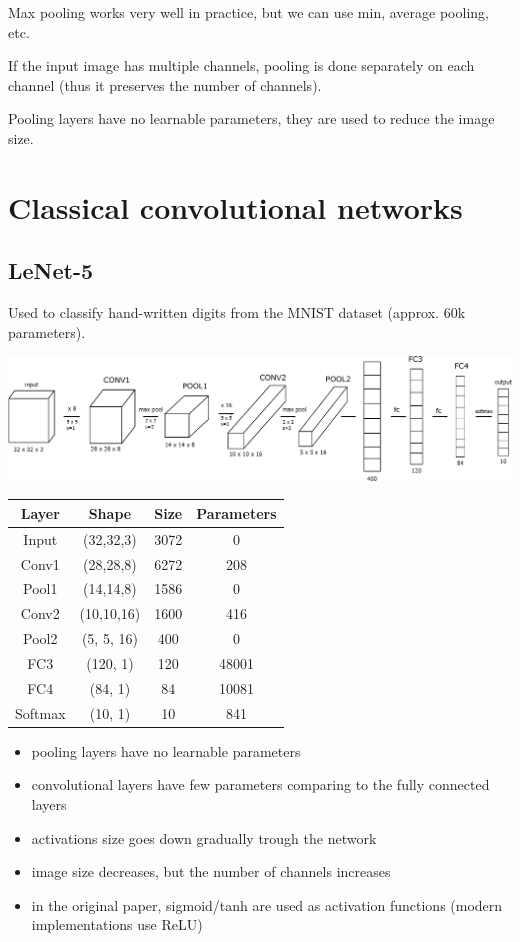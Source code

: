 \documentclass[a4paper,11pt]{report}
\begin{document}
Max pooling works very well in practice, but we can use min, average pooling, etc.

If the input image has multiple channels, pooling is done separately on each channel (thus it preserves the number of channels).

Pooling layers have no learnable parameters, they are used to reduce the image size.


\section{Classical convolutional networks}

\subsection*{LeNet-5}

Used to classify hand-written digits from the MNIST dataset (approx. 60k parameters).

\begin{center}
\includegraphics[width = 6in]{convolutions/lenet}
\end{center}

\begin{tabular}{|c|c|c|c|}
  \hline
  Layer & Shape & Size & Parameters\\
  \hline
  Input   & (32,32,3)  & 3072 & 0 \\
  Conv1   & (28,28,8)  & 6272 & 208 \\
  Pool1   & (14,14,8)  & 1586 & 0 \\
  Conv2   & (10,10,16) & 1600 & 416 \\
  Pool2   & (5, 5, 16) & 400  & 0 \\
  FC3     & (120,   1) & 120  & 48001 \\
  FC4     & (84,    1) & 84   & 10081 \\
  Softmax & (10,    1) & 10   & 841 \\
  \hline
\end{tabular}

\begin{itemize}
  \item pooling layers have no learnable parameters
  \item convolutional layers have few parameters comparing to the fully connected layers
  \item activations size goes down gradually trough the network
  \item image size decreases, but the number of channels increases
  \item in the original paper, sigmoid/tanh are used as activation functions (modern implementations use ReLU)
\end{itemize}
\end{document}
